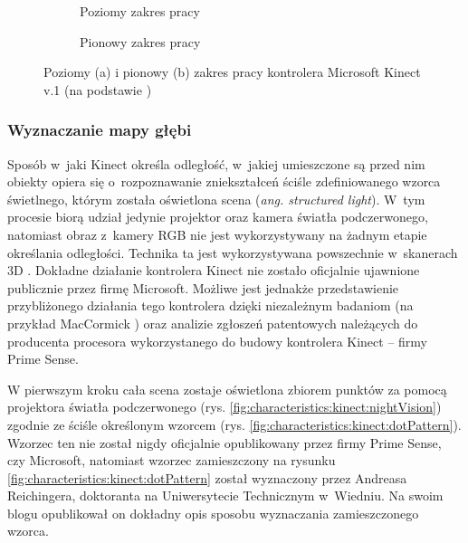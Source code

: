 \begin{savenotes}
	\begin{figure}[!htb]
		\centering
		\begin{subfigure}[b]{0.5\textwidth}
			\centering
			
			\caption{Poziomy zakres pracy}
			\label{fig:kinect:range:a}
		\end{subfigure} \hfill
		\begin{subfigure}[b]{0.5\textwidth}
			\centering
			
			\caption{Pionowy zakres pracy}
			\label{fig:kinect:range:b}
		\end{subfigure} \hfill
		\begin{subfigure}[p]{\textwidth}
			\hfill
			               
		\end{subfigure}
																							
		\caption[Poziomy i pionowy zakres pracy kontrolera Microsoft Kinect v.1]{Poziomy (a) i pionowy (b) zakres pracy kontrolera Microsoft Kinect v.1 (na podstawie )}
		\label{fig:characteristics:kinect:range}	
	\end{figure}
\end{savenotes} 
																															
\subsubsection*{Wyznaczanie mapy głębi}
Sposób w~jaki Kinect określa odległość, w~jakiej umieszczone są przed nim obiekty opiera się o~rozpoznawanie zniekształceń ściśle zdefiniowanego wzorca świetlnego, którym została oświetlona scena (\emph{ang. structured light}). W~tym procesie biorą udział jedynie projektor oraz kamera światła podczerwonego, natomiast obraz z~kamery RGB nie jest wykorzystywany na żadnym etapie określania odległości. Technika ta jest wykorzystywana powszechnie w~skanerach 3D  . Dokładne działanie kontrolera Kinect nie zostało oficjalnie ujawnione publicznie przez firmę Microsoft. Możliwe jest jednakże przedstawienie przybliżonego działania tego kontrolera dzięki niezależnym badaniom (na przykład MacCormick \cite{MacCormick2011}) oraz analizie zgłoszeń patentowych \cite{patent:20080106746,patent:20100020078,patent:20100118123} należących do producenta procesora wykorzystanego do budowy kontrolera Kinect -- firmy Prime Sense.
																															
W pierwszym kroku cała scena zostaje oświetlona zbiorem punktów za pomocą projektora światła podczerwonego (rys. \ref{fig:characteristics:kinect:nightVision}) zgodnie ze ściśle określonym wzorcem (rys. \ref{fig:characteristics:kinect:dotPattern}). Wzorzec ten nie został nigdy oficjalnie opublikowany przez firmy Prime Sense, czy Microsoft, natomiast wzorzec zamieszczony na rysunku \ref{fig:characteristics:kinect:dotPattern} został wyznaczony przez Andreasa Reichingera, doktoranta na Uniwersytecie Technicznym w~Wiedniu. Na swoim blogu opublikował on dokładny opis sposobu wyznaczania zamieszczonego wzorca.
																															
